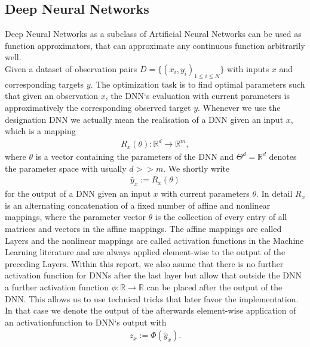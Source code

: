 \documentclass[conference]{IEEEtran}
\begin{document}
	\subsection{Deep Neural Networks}
	Deep Neural Networks as a subclass of Artificial Neural Networks can be used as function approximators, that can approximate any continuous function arbitrarily well.\\ Given a dataset of observation pairs $D =\{(x_{i}, y_{i})_{1\leq i\leq N}\}$ with inputs ${x}$ and corresponding targets $y$. The optimization task is to find optimal parameters such that given an observation $x$, the DNN`s evaluation with current parameters is approximatively the corresponding observed target $y$.  {\color{red}Whenever we use the designation
	DNN we actually mean the realisation of a DNN} given an input $x$, which is a mapping
	\begin{align}
	R_{x}(\theta):\mathbb{R}^{d}\rightarrow\mathbb{R}^{m},
	\end{align}
	where $\theta$ is a vector containing the parameters of the DNN and {\color{red}$\Theta^{d}=\mathbb{R}^{d}$} denotes the parameter space with usually $d >> m$. We shortly write 
	\begin{align} 
	\hat{y}_{x} := R_{x}(\theta)
	\end{align}
	for the output of a DNN given an input $x$ with current parameters $\theta$. In detail $R_{x}$ is an alternating concatenation of a fixed number of affine and nonlinear mappings, where the parameter vector $\theta$ is the collection of every entry of all matrices and vectors in the affine mappings. The affine mappings are called Layers and the nonlinear mappings are called activation functions in the Machine Learning literature and are always applied element-wise to the output of the preceding Layers. %
	Within this report, we also asume that there is no further activation function for DNNs after the last layer but allow that outside the DNN a further activation function $\phi:\mathbb{R}\rightarrow\mathbb{R}$ can be placed after the output of the DNN. This allows us to use technical tricks that later favor the implementation.
	In that case we denote the output of the afterwards element-wise application of an activationfunction to DNN`s output with
	\begin{align}
	z_{x} := \Phi(\hat{y}_{x}).
	\end{align}
	
\end{document}
